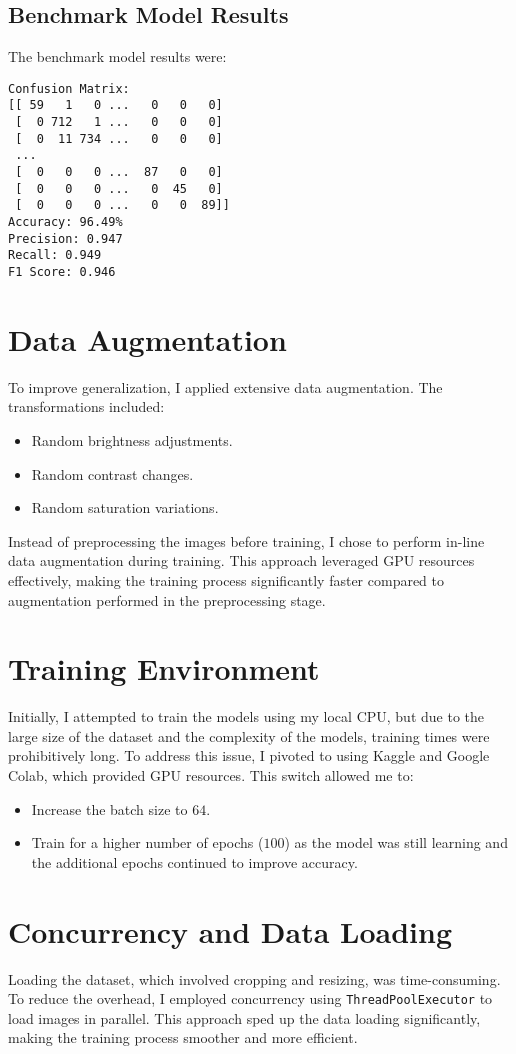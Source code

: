 \documentclass[11pt]{article}
\begin{document}
\subsection{Benchmark Model Results}
The benchmark model results were:
\begin{verbatim}
Confusion Matrix:
[[ 59   1   0 ...   0   0   0]
 [  0 712   1 ...   0   0   0]
 [  0  11 734 ...   0   0   0]
 ...
 [  0   0   0 ...  87   0   0]
 [  0   0   0 ...   0  45   0]
 [  0   0   0 ...   0   0  89]]
Accuracy: 96.49%
Precision: 0.947
Recall: 0.949
F1 Score: 0.946
\end{verbatim}

\section{Data Augmentation}
To improve generalization, I applied extensive data augmentation. The transformations included:
\begin{itemize}
    \item Random brightness adjustments.
    \item Random contrast changes.
    \item Random saturation variations.
\end{itemize}
Instead of preprocessing the images before training, I chose to perform in-line data augmentation during training. This approach leveraged GPU resources effectively, making the training process significantly faster compared to augmentation performed in the preprocessing stage.

\section{Training Environment}
Initially, I attempted to train the models using my local CPU, but due to the large size of the dataset and the complexity of the models, training times were prohibitively long. To address this issue, I pivoted to using Kaggle and Google Colab, which provided GPU resources. This switch allowed me to:
\begin{itemize}
    \item Increase the batch size to $64$.
    \item Train for a higher number of epochs ($100$) as the model was still learning and the additional epochs continued to improve accuracy.
\end{itemize}

\section{Concurrency and Data Loading}
Loading the dataset, which involved cropping and resizing, was time-consuming. To reduce the overhead, I employed concurrency using \texttt{ThreadPoolExecutor} to load images in parallel. This approach sped up the data loading significantly, making the training process smoother and more efficient.
\end{document}
